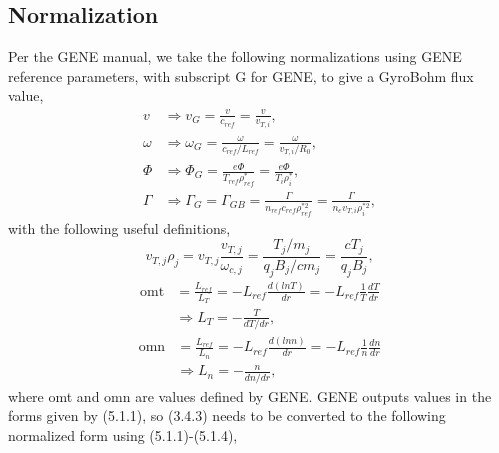 \documentclass[12pt]{article}
\numberwithin{equation}{subsection}
\begin{document}
\subsection{Normalization}
   \quad Per the GENE manual\cite{GENE}, we take the following normalizations using GENE reference parameters, with subscript G for GENE,
to give a GyroBohm flux value,
   \begin{equation}
   \begin{aligned}
      v      &\Rightarrow v_G      = \frac{v}{c_{ref}} = \frac{v}{v_{T,i}}, \\
      \omega &\Rightarrow \omega_G = \frac{\omega}{c_{ref}/L_{ref}} = \frac{\omega}{v_{T,i}/R_0}, \\
      \Phi   &\Rightarrow \Phi_G   = \frac{e\Phi}{T_{ref}\rho_{ref}^*} = \frac{e\Phi}{T_i\rho_i^{*}},\\
      \Gamma &\Rightarrow \Gamma_G = \Gamma_{GB} = \frac{\Gamma}{n_{ref}c_{ref}\rho_{ref}^{*2}} = \frac{\Gamma}{n_ev_{T,i}\rho_i^{*2}},
   \end{aligned}
   \end{equation}
with the following useful definitions,
   \begin{equation}
      v_{T,j}\rho_j = v_{T,j}\frac{v_{T,j}}{\omega_{c,j}} = \frac{T_j/m_j}{q_jB_j/cm_j} = \frac{cT_j}{q_jB_j},
   \end{equation}
   \begin{equation}
   \begin{aligned}
      \mathrm{omt} &= \frac{L_{ref}}{L_T} = -L_{ref}\frac{d(lnT)}{dr} = -L_{ref}\frac{1}{T}\frac{dT}{dr} \\
                   &\Rightarrow L_T = -\frac{T}{dT/dr},
   \end{aligned}
   \end{equation}
   \begin{equation}
   \begin{aligned}
      \mathrm{omn} &= \frac{L_{ref}}{L_n} = -L_{ref}\frac{d(lnn)}{dr} = -L_{ref}\frac{1}{n}\frac{dn}{dr} \\
                   &\Rightarrow L_n = -\frac{n}{dn/dr},
   \end{aligned}
   \end{equation}
where omt and omn are values defined by GENE\cite{GENE}. GENE outputs values in the forms given by (5.1.1), so
(3.4.3) needs to be converted to the following normalized form using (5.1.1)-(5.1.4),
\end{document}
